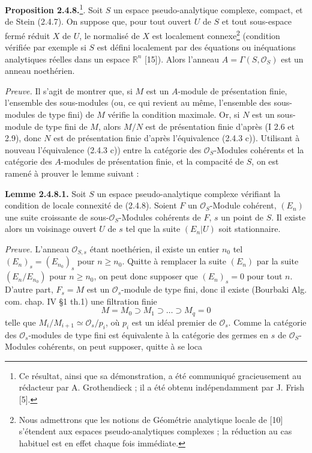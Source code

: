 \textbf{Proposition 2.4.8.}\footnote{Ce résultat, ainsi que sa démonstration, a été communiqué gracieusement au rédacteur par A. Grothendieck ; il a été obtenu indépendamment par J. Frish [5].}. Soit $S$ un espace pseudo-analytique complexe, compact, et de Stein (2.4.7). On suppose que, pour tout ouvert $U$ de $S$ et tout sous-espace fermé réduit $X$ de $U$, le normalisé de $X$ est localement connexe\footnote{Nous admettrons que les notions de Géométrie analytique locale de [10] s'étendent aux espaces pseudo-analytiques complexes ; la réduction au cas habituel est en effet chaque fois immédiate.} (condition vérifiée par exemple si $S$ est défini localement par des équations ou inéquations analytiques réelles dans un espace $\mathbb R^n$ [15]). Alors l'anneau $A=\Gamma(S,\mathcal O_S)$ est un anneau noethérien.

\emph{Preuve.} Il s'agit de montrer que, si $M$ est un $A$-module de présentation finie, l'ensemble des sous-modules (ou, ce qui revient au même, l'ensemble des sous-modules de type fini) de $M$ vérifie la condition maximale. Or, si $N$ est un sous-module de type fini de $M$, alors $M/N$ est de présentation finie d'après (I 2.6 et 2.9), donc $N$ est de présentation finie d'après l'équivalence (2.4.3 c)). Utilisant à nouveau l'équivalence (2.4.3 c)) entre la catégorie des $\mathcal O_S$-Modules cohérents et la catégorie des $A$-modules de présentation finie, et la compacité de $S$, on est ramené à prouver le lemme suivant :

\textbf{Lemme 2.4.8.1.} Soit $S$ un espace pseudo-analytique complexe vérifiant la condition de locale connexité de (2.4.8). Soient $F$ un $\mathcal O_S$-Module cohérent, $(E_n)$ une suite croissante de sous-$\mathcal O_S$-Modules cohérents de $F$, $s$ un point de $S$. Il existe alors un voisinage ouvert $U$ de $s$ tel que la suite $(E_n|U)$ soit stationnaire.

\emph{Preuve.} L'anneau $\mathcal O_{S,s}$ étant noethérien, il existe un entier $n_0$ tel $(E_n)_s=(E_{n_0})_s$ pour $n\geq n_0$. Quitte à remplacer la suite $(E_n)$ par la suite $(E_n/E_{n_0})$ pour $n\geq n_0$, on peut donc supposer que $(E_n)_s=0$ pour tout $n$. D'autre part, $F_s=M$ est un $\mathcal O_s$-module de type fini, donc il existe (Bourbaki Alg. com. chap. IV \S1 th.1) une filtration finie
\[
 M=M_0\supset M_1\supset\ldots\supset M_q=0
\]
telle que $M_i/M_{i+1}\simeq \mathcal O_s/p_i$, où $p_i$ est un idéal premier de $\mathcal O_s$. Comme la catégorie des $\mathcal O_s$-modules de type fini est équivalente à la catégorie des germes en $s$ de $\mathcal O_S$-Modules cohérents, on peut supposer, quitte à se
loca%
